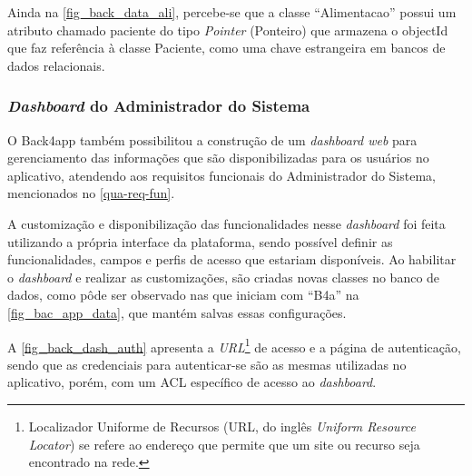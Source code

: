 Ainda na \autoref{fig_back_data_ali}, percebe-se que a classe ``Alimentacao'' possui um atributo chamado paciente do tipo
\emph{Pointer} (Ponteiro) que armazena o objectId que faz referência à classe Paciente, como uma chave estrangeira em
bancos de dados relacionais.

\subsubsection{\emph{Dashboard} do Administrador do Sistema}

O Back4app também possibilitou a construção de um \emph{dashboard web} para gerenciamento das informações que são disponibilizadas
para os usuários no aplicativo, atendendo aos requisitos funcionais do Administrador do Sistema, mencionados no \autoref{qua-req-fun}.

A customização e disponibilização das funcionalidades nesse \emph{dashboard} foi feita utilizando a própria
interface da plataforma, sendo possível definir as funcionalidades, campos e perfis de acesso que estariam
disponíveis. Ao habilitar o \emph{dashboard} e realizar as customizações, são criadas novas classes no banco
de dados, como pôde ser observado nas que iniciam com ``B4a'' na \autoref{fig_bac_app_data}, que mantém salvas
essas configurações.

A \autoref{fig_back_dash_auth} apresenta a \emph{URL}\footnote{Localizador Uniforme de Recursos (URL, do inglês \emph{Uniform
        Resource Locator}) se refere ao endereço que permite que um site ou recurso seja encontrado na rede.}
de acesso e a página de autenticação, sendo que as credenciais para autenticar-se são as mesmas utilizadas no aplicativo, porém, com um ACL específico de acesso ao \emph{dashboard}.

